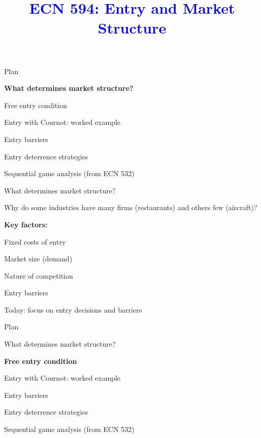 \documentclass[notes,11pt, aspectratio=169]{beamer}
\title[]{\textcolor{blue}{ECN 594: Entry and Market Structure}}
\author[PGP]{}
\institute[FRBNY]{\small{\begin{tabular}{c c c}
Nicholas Vreugdenhil \\
\end{tabular}}}
\date{}
\newenvironment{wideitemize}{\itemize\addtolength{\itemsep}{10pt}}{\enditemize}
\newenvironment{wideenumerate}{\enumerate\addtolength{\itemsep}{10pt}}{\endenumerate}
\begin{document}
\begin{frame}
\maketitle
  \centering
\end{frame}

\begin{frame}{Plan}
  \begin{wideenumerate}
    \item \textbf{What determines market structure?}
    \item Free entry condition
    \item Entry with Cournot: worked example
    \item Entry barriers
    \item Entry deterrence strategies
    \item Sequential game analysis (from ECN 532)
  \end{wideenumerate}
\end{frame}


\begin{frame}{What determines market structure?}
	\begin{wideitemize}
		\item Why do some industries have many firms (restaurants) and others few (aircraft)?
		\item \textbf{Key factors:}
		\begin{wideenumerate}
			\vspace{5pt}
			\item Fixed costs of entry
			\item Market size (demand)
			\item Nature of competition
			\item Entry barriers
		\end{wideenumerate}
		\item Today: focus on entry decisions and barriers
	\end{wideitemize}
\end{frame}

\begin{frame}{Plan}
  \begin{wideenumerate}
    \item What determines market structure?
    \item \textbf{Free entry condition}
    \item Entry with Cournot: worked example
    \item Entry barriers
    \item Entry deterrence strategies
    \item Sequential game analysis (from ECN 532)
  \end{wideenumerate}
\end{frame}
\end{document}
